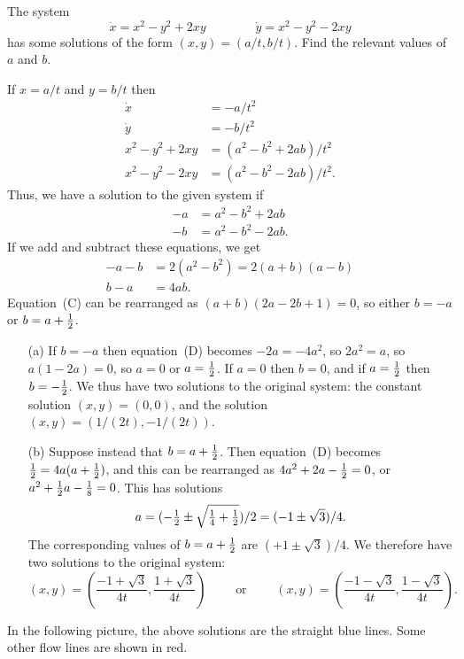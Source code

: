 \documentclass[a4paper]{amsart}
\begin{document}
\begin{exercise}\label{ex-fluid}
 The system 
 \[ \dot{x} = x^2-y^2+2xy \hspace{4em} \dot{y} = x^2-y^2-2xy \]
 has some solutions of the form $(x,y)=(a/t,b/t)$.  Find the relevant
 values of $a$ and $b$.
\end{exercise}
\begin{solution}
 If $x=a/t$ and $y=b/t$ then 
 \begin{align*}
  \dot{x} &= -a/t^2 \\
  \dot{y} &= -b/t^2 \\
  x^2-y^2+2xy &= (a^2-b^2+2ab)/t^2 \\
  x^2-y^2-2xy &= (a^2-b^2-2ab)/t^2.
 \end{align*}
 Thus, we have a solution to the given system if
 \begin{align*}
  -a &= a^2-b^2+2ab \tag{A} \\
  -b &= a^2-b^2-2ab. \tag{B}
 \end{align*}
 If we add and subtract these equations, we get
 \begin{align*}
  -a-b &= 2(a^2-b^2) = 2(a+b)(a-b) \tag{C} \\
   b-a &= 4ab. \tag{D}
 \end{align*}
 Equation~(C) can be rearranged as $(a+b)(2a-2b+1)=0$, so either
 $b=-a$ or $b=a+\tfrac{1}{2}$.  
 \begin{itemize}
  \item[(a)] If $b=-a$ then equation~(D) becomes $-2a=-4a^2$, so
   $2a^2=a$, so $a(1-2a)=0$, so $a=0$ or $a=\tfrac{1}{2}$.  If $a=0$ then
   $b=0$, and if $a=\tfrac{1}{2}$ then $b=-\tfrac{1}{2}$.  We thus have two
   solutions to the original system: the constant solution
   $(x,y)=(0,0)$, and the solution $(x,y)=(1/(2t),-1/(2t))$.
  \item[(b)] Suppose instead that $b=a+\tfrac{1}{2}$.  Then equation~(D)
   becomes $\tfrac{1}{2}=4a(a+\tfrac{1}{2})$, and this can be rearranged as
   $4a^2+2a-\tfrac{1}{2}=0$, or $a^2+\tfrac{1}{2} a-\tfrac{1}{8}=0$.  This has
   solutions 
   \[ a = (-\tfrac{1}{2}\pm\sqrt{\tfrac{1}{4}+\tfrac{1}{2}})/2 = 
        (-1\pm\sqrt{3})/4.
   \]
   The corresponding values of $b=a+\tfrac{1}{2}$ are $(+1\pm\sqrt{3})/4$.
   We therefore have two solutions to the original system:
   \[
    (x,y) =
     \left(\frac{-1+\sqrt{3}}{4t},\frac{1+\sqrt{3}}{4t}\right)
    \qquad \text{ or } \qquad
    (x,y) =
     \left(\frac{-1-\sqrt{3}}{4t},\frac{1-\sqrt{3}}{4t}\right).
   \]
 \end{itemize}
 In the following picture, the above solutions are the straight blue
 lines.  Some other flow lines are shown in red.


\end{solution}
\end{document}
